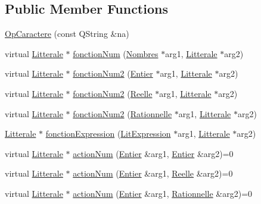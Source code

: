 \subsection*{Public Member Functions}
\begin{DoxyCompactItemize}
\item 
\hyperlink{class_op_caractere_a63c38dc6f6843f6a5d13d9c66551fb59}{Op\+Caractere} (const Q\+String \&na)
\item 
virtual \hyperlink{class_litterale}{Litterale} $\ast$ \hyperlink{class_op_caractere_a1bf53676903dbdcff31c9528f5cf09c7}{fonction\+Num} (\hyperlink{class_nombres}{Nombres} $\ast$arg1, \hyperlink{class_litterale}{Litterale} $\ast$arg2)
\item 
virtual \hyperlink{class_litterale}{Litterale} $\ast$ \hyperlink{class_op_caractere_a1bd2534371e5d09150131ab4ceb31013}{fonction\+Num2} (\hyperlink{class_entier}{Entier} $\ast$arg1, \hyperlink{class_litterale}{Litterale} $\ast$arg2)
\item 
virtual \hyperlink{class_litterale}{Litterale} $\ast$ \hyperlink{class_op_caractere_aea29b98d94bb1b4d26c38a77cddeec3c}{fonction\+Num2} (\hyperlink{class_reelle}{Reelle} $\ast$arg1, \hyperlink{class_litterale}{Litterale} $\ast$arg2)
\item 
virtual \hyperlink{class_litterale}{Litterale} $\ast$ \hyperlink{class_op_caractere_a9939635a4bd04ae96ef07a57991b665d}{fonction\+Num2} (\hyperlink{class_rationnelle}{Rationnelle} $\ast$arg1, \hyperlink{class_litterale}{Litterale} $\ast$arg2)
\item 
\hyperlink{class_litterale}{Litterale} $\ast$ \hyperlink{class_op_caractere_ae79a9c802c54f07d7650603c58d44eff}{fonction\+Expression} (\hyperlink{class_lit_expression}{Lit\+Expression} $\ast$arg1, \hyperlink{class_litterale}{Litterale} $\ast$arg2)
\item 
virtual \hyperlink{class_litterale}{Litterale} $\ast$ \hyperlink{class_op_caractere_ab223e679ae6fc710dd1c0297bafa893a}{action\+Num} (\hyperlink{class_entier}{Entier} \&arg1, \hyperlink{class_entier}{Entier} \&arg2)=0
\item 
virtual \hyperlink{class_litterale}{Litterale} $\ast$ \hyperlink{class_op_caractere_aa2cfbd2038de905702b9d83d7d926cdc}{action\+Num} (\hyperlink{class_entier}{Entier} \&arg1, \hyperlink{class_reelle}{Reelle} \&arg2)=0
\item 
virtual \hyperlink{class_litterale}{Litterale} $\ast$ \hyperlink{class_op_caractere_a4e5b229898e12c67082ba8bc3860710c}{action\+Num} (\hyperlink{class_entier}{Entier} \&arg1, \hyperlink{class_rationnelle}{Rationnelle} \&arg2)=0

\end{DoxyCompactItemize}
